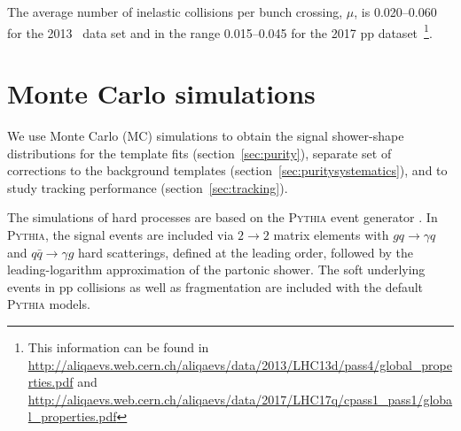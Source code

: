 The average number of inelastic collisions per bunch crossing, $\mu$, is 0.020--0.060 for the 2013 \pPb~data set and in the range 0.015--0.045 for the 2017 pp dataset~\footnote{This information can be found in \url{http://aliqaevs.web.cern.ch/aliqaevs/data/2013/LHC13d/pass4/global_properties.pdf} and \url{http://aliqaevs.web.cern.ch/aliqaevs/data/2017/LHC17q/cpass1_pass1/global_properties.pdf}}.%







\section{Monte Carlo simulations}
\label{sec:mcsimulations}
We use Monte Carlo (MC) simulations to obtain the signal shower-shape distributions for the template fits (section~\ref{sec:purity}), separate set of corrections to the background templates (section~\ref{sec:puritysystematics}), and to study tracking performance (section~\ref{sec:tracking}).

The simulations of hard processes are based on the \textsc{Pythia} event generator \cite{zotero-332}. In \textsc{Pythia}, the signal events are included via $2\to2$ matrix elements with $gq\to\gamma q$ and $q\bar{q}\to\gamma g$ hard scatterings, defined at the leading order, followed by the leading-logarithm approximation of the partonic shower. The soft underlying events in pp collisions as well as fragmentation are included with the default \textsc{Pythia} models. 

